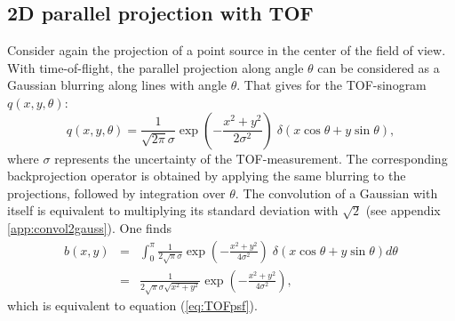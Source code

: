 \subsection{2D parallel projection with TOF}
Consider again the projection of a point source in the center of the
field of view. With time-of-flight, the parallel projection along
angle $\theta$ can be considered as a Gaussian blurring along lines
with angle $\theta$. That gives for the TOF-sinogram $q(x,y,\theta)$:
\begin{equation}
 q(x,y,\theta) = \frac{1}{\sqrt{2\pi}\sigma}
               \exp(-\frac{x^2+y^2}{2 \sigma^2}) \;
              \delta(x\cos\theta + y\sin\theta),
\end{equation}
where $\sigma$ represents the uncertainty of the TOF-measurement. The
corresponding backprojection operator is obtained by applying the same
blurring to the projections, followed by integration over
$\theta$. The convolution of a Gaussian with itself is equivalent to
multiplying its standard deviation with $\sqrt{2}$ (see appendix
\ref{app:convol2gauss}). One finds
\begin{align}
  b(x,y) & = & \int_0^\pi \frac{1}{2\sqrt{\pi}\sigma}
               \exp(-\frac{x^2+y^2}{4 \sigma^2}) \;
              \delta(x\cos\theta + y\sin\theta) d\theta\\
 &=& \frac{1}{2\sqrt{\pi}\sigma \sqrt{x^2 + y^2}}
               \exp(-\frac{x^2+y^2}{4 \sigma^2}),
\end{align}
which is equivalent to equation (\ref{eq:TOFpsf}).
